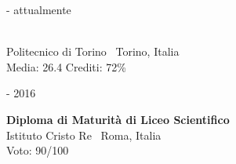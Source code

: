 \begin{minipage}{.3\textwidth}
	 - attualmente \faCalendar
\end{minipage}
\hfill
\begin{minipage}{.65\textwidth}
	\vfill
	 \\
	\color{Maroon} Politecnico di Torino \hfill \color{Sepia} \faMapMarker \ Torino, Italia \\
	\color{gray} Media: 26.4 \hspace{25px} Crediti: 72\% 
	\vfill
\end{minipage}

\bigskip

\begin{minipage}{.3\textwidth}
	 - 2016 \faCalendar
\end{minipage}
\hfill
\begin{minipage}{.64\textwidth}
	\vfill
	{\large \textbf{Diploma di Maturità di Liceo Scientifico}} \\
	\color{Maroon} Istituto Cristo Re \hfill \color{Sepia} \faMapMarker \ Roma, Italia \\
	\color{gray} Voto: 90/100
	\vfill
\end{minipage}